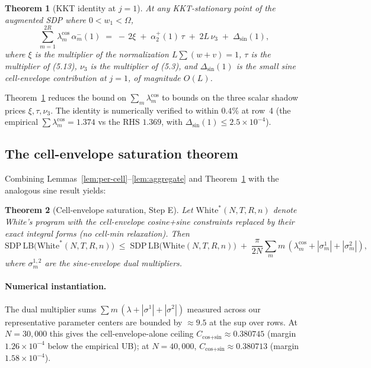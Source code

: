 \documentclass[11pt]{article}
\theoremstyle{plain}
\newtheorem{theorem}{Theorem}
\theoremstyle{definition}
\begin{document}
\begin{theorem}[KKT identity at $j=1$]\label{thm:kkt}
At any KKT-stationary point of the augmented SDP where $0 < w_1 < \Omega$,
\[
\sum_{m=1}^{2R} \lambda_m^{\cos}\, \alpha_m^-(1)
\;=\;
-\,2\xi \;+\; \alpha_2^+(1)\, \tau \;+\; 2 L\, \nu_3
\;+\; \Delta_{\sin}(1),
\]
where $\xi$ is the multiplier of the normalization
$L \sum (w + v) = 1$, $\tau$ is the multiplier of (5.13), $\nu_3$ is
the multiplier of (5.3), and $\Delta_{\sin}(1)$ is the small sine
cell-envelope contribution at $j=1$, of magnitude $O(L)$.
\end{theorem}

Theorem~\ref{thm:kkt} reduces the bound on $\sum_m \lambda_m^{\cos}$
to bounds on the three scalar shadow prices $\xi, \tau, \nu_3$. The
identity is numerically verified to within $0.4\%$ at row~4 (the
empirical $\sum \lambda_m^{\cos} = 1.374$ vs the RHS $1.369$, with
$\Delta_{\sin}(1) \le 2.5 \times 10^{-4}$).


\subsection{The cell-envelope saturation theorem}

Combining Lemmas~\ref{lem:per-cell}--\ref{lem:aggregate} and
Theorem~\ref{thm:kkt} with the analogous sine result yields:

\begin{theorem}[Cell-envelope saturation, Step E]\label{thm:cell-env}
Let $\mathrm{White}^*(N, T, R, n)$ denote White's program with the
cell-envelope cosine+sine constraints replaced by their exact
integral forms (no cell-min relaxation). Then
\[
\mathrm{SDP\,LB}\bigl(\mathrm{White}^*(N, T, R, n)\bigr)
\;\le\; \mathrm{SDP\,LB}\bigl(\mathrm{White}(N, T, R, n)\bigr)
\;+\; \frac{\pi}{2N} \sum_m m\, (\lambda_m^{\cos} + |\sigma_m^1| + |\sigma_m^2|),
\]
where $\sigma_m^{1,2}$ are the sine-envelope dual multipliers.
\end{theorem}

\paragraph{Numerical instantiation.}
The dual multiplier sums $\sum m\, (\lambda + |\sigma^1| + |\sigma^2|)$
measured across our representative parameter centers are bounded by
$\approx 9.5$ at the sup over rows. At $N = 30{,}000$ this gives the
cell-envelope-alone ceiling $C_{\text{cos+sin}} \approx 0.380745$
(margin $1.26 \times 10^{-4}$ below the empirical UB); at
$N = 40{,}000$, $C_{\text{cos+sin}} \approx 0.380713$ (margin
$1.58 \times 10^{-4}$).
\end{document}
